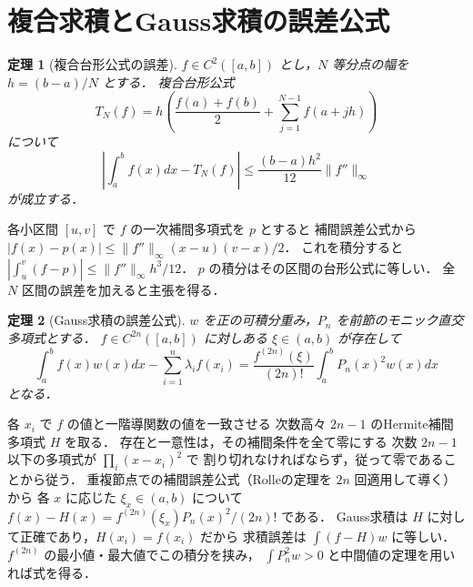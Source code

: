 \documentclass[a5paper,10pt,onecolumn]{jsarticle}
\makeatletter
\theoremstyle{mathnotetheorem}
\newtheorem{theorem}{定理}[section]
\renewcommand{\proofname}{証明}
\renewenvironment{proof}[1][\proofname]{%
  \par\pushQED{\qed}\normalfont\topsep4\p@\@plus2\p@\relax
  \trivlist\item[\hskip\labelsep\bfseries #1]\ignorespaces
}{\popQED\endtrivlist\@endpefalse}
\newcommand{\norm}[1]{\lVert #1\rVert}
\makeatother
\begin{document}
\section{複合求積とGauss求積の誤差公式}
\begin{theorem}[複合台形公式の誤差]
$f\in C^2([a,b])$ とし，$N$ 等分点の幅を $h=(b-a)/N$ とする．
複合台形公式
\[
 T_N(f)=h\left(\frac{f(a)+f(b)}2+
 \sum_{j=1}^{N-1}f(a+jh)\right)
\]
について
\[
 \left|\int_a^bf(x)dx-T_N(f)\right|
 \le\frac{(b-a)h^2}{12}\norm{f''}_\infty
\]
が成立する．
\end{theorem}
\begin{proof}
各小区間 $[u,v]$ で $f$ の一次補間多項式を $p$ とすると
補間誤差公式から
$|f(x)-p(x)|\le\norm{f''}_\infty(x-u)(v-x)/2$．
これを積分すると
$|\int_u^v(f-p)|\le\norm{f''}_\infty h^3/12$．
$p$ の積分はその区間の台形公式に等しい．
全 $N$ 区間の誤差を加えると主張を得る．
\end{proof}
\begin{theorem}[Gauss求積の誤差公式]
$w$ を正の可積分重み，$P_n$ を前節のモニック直交多項式とする．
$f\in C^{2n}([a,b])$ に対しある $\xi\in(a,b)$ が存在して
\[
 \int_a^b f(x)w(x)dx-\sum_{i=1}^n\lambda_i f(x_i)
 =\frac{f^{(2n)}(\xi)}{(2n)!}
 \int_a^bP_n(x)^2w(x)dx
\]
となる．
\end{theorem}
\begin{proof}
各 $x_i$ で $f$ の値と一階導関数の値を一致させる
次数高々 $2n-1$ のHermite補間多項式 $H$ を取る．
存在と一意性は，その補間条件を全て零にする
次数 $2n-1$ 以下の多項式が $\prod_i(x-x_i)^2$ で
割り切れなければならず，従って零であることから従う．
重複節点での補間誤差公式（Rolleの定理を $2n$ 回適用して導く）から
各 $x$ に応じた $\xi_x\in(a,b)$ について
$ f(x)-H(x)=f^{(2n)}(\xi_x)P_n(x)^2/(2n)!$ である．
Gauss求積は $H$ に対して正確であり，$H(x_i)=f(x_i)$ だから
求積誤差は $\int(f-H)w$ に等しい．
$f^{(2n)}$ の最小値・最大値でこの積分を挟み，
$\int P_n^2w>0$ と中間値の定理を用いれば式を得る．
\end{proof}
\end{document}
